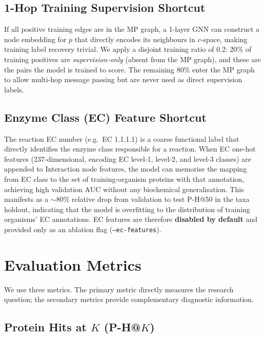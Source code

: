 \subsection{1-Hop Training Supervision Shortcut}

If all positive training edges are in the MP graph, a 1-layer GNN can construct
a node embedding for $p$ that directly encodes its neighbours in $c$-space,
making training label recovery trivial.
We apply a disjoint training ratio of 0.2: 20\% of training positives are
\emph{supervision-only} (absent from the MP graph), and these are the pairs the
model is trained to score.
The remaining 80\% enter the MP graph to allow multi-hop message passing but
are never used as direct supervision labels.

\subsection{Enzyme Class (EC) Feature Shortcut}

The reaction EC number (e.g.\ EC 1.1.1.1) is a coarse functional label that
directly identifies the enzyme class responsible for a reaction.
When EC one-hot features (237-dimensional, encoding EC level-1, level-2, and
level-3 classes) are appended to Interaction node features, the model can memorise
the mapping from EC class to the set of training-organism proteins with that
annotation, achieving high validation AUC without any biochemical generalisation.
This manifests as a $\sim$80\% relative drop from validation to test P-H@50
in the taxa holdout, indicating that the model is overfitting to the distribution
of training organisms' EC annotations.
EC features are therefore \textbf{disabled by default} and provided only as an
ablation flag (\texttt{--ec-features}).


\section{Evaluation Metrics}
\label{app:metrics}

We use three metrics.
The primary metric directly measures the research question; the secondary metrics
provide complementary diagnostic information.

\subsection{Protein Hits at \texorpdfstring{$K$}{K} (P-H@$K$)}
\label{app:phk}


